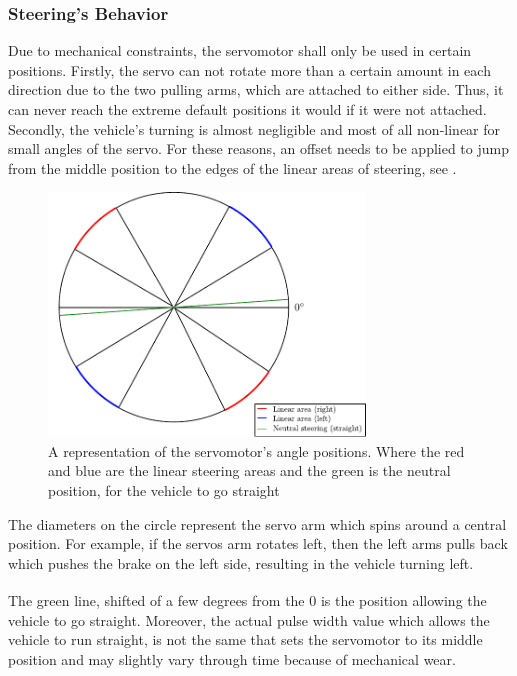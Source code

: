 \subsubsection{Steering's Behavior}\label{sec:SteeringBehavior}
Due to mechanical constraints, the servomotor shall only be used in certain positions. 
Firstly, the servo can not rotate more than a certain amount in each direction due to the two pulling arms, which are attached to either side. Thus, it can never reach the extreme default positions it would if it were not attached.
Secondly, the vehicle's turning is almost negligible and most of all non-linear for small angles of the servo. For these reasons, an offset needs to be applied to jump from the middle position to the edges of the linear areas of steering, see .
\begin{figure}[H]
  \centering  
  \includegraphics[width=0.75\textwidth]{figures/servoSteeringLinearArea.pdf}
  \caption{A representation of the servomotor's angle positions. Where the red and blue are the linear steering areas and the green is the neutral position, for the vehicle to go straight}
  \label{fig:servoSteeringLinearArea}
\end{figure}\vspace{-5mm}
The diameters on the circle represent the servo arm which spins around a central position. For example, if the servos arm rotates left, then the left arms pulls back which pushes the brake on the left side, resulting in the vehicle turning left.

The green line, shifted of a few degrees from the \si{0^{\circ}} is the position allowing the vehicle to go straight. Moreover, the actual pulse width value which allows the vehicle to run straight, is not the same that sets the servomotor to its middle position and may slightly vary through time because of mechanical wear.

